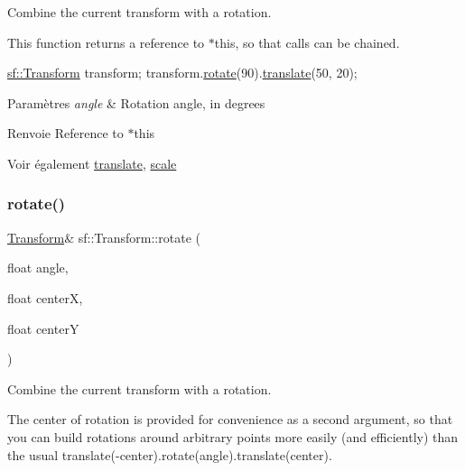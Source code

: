 Combine the current transform with a rotation. 

This function returns a reference to $\ast$this, so that calls can be chained. 
\begin{DoxyCode}
\hyperlink{classsf_1_1Transform}{sf::Transform} transform;
transform.\hyperlink{classsf_1_1Transform_a3e548c3c9e3fb9d4bd43cf852669e555}{rotate}(90).\hyperlink{classsf_1_1Transform_ab54f6c8070cc05e2afcb3145fbf4395a}{translate}(50, 20);
\end{DoxyCode}



\begin{DoxyParams}{Paramètres}
{\em angle} & Rotation angle, in degrees\\
\hline
\end{DoxyParams}
\begin{DoxyReturn}{Renvoie}
Reference to $\ast$this
\end{DoxyReturn}
\begin{DoxySeeAlso}{Voir également}
\hyperlink{classsf_1_1Transform_ab54f6c8070cc05e2afcb3145fbf4395a}{translate}, \hyperlink{classsf_1_1Transform_a3f46af807f69d74120fb836334268671}{scale} 
\end{DoxySeeAlso}
\mbox{\label{classsf_1_1Transform_af0b7cc3fed36d0fa22d5d331a779eee2}} 
\subsubsection{\texorpdfstring{rotate()}{rotate()}\hspace{0.1cm}{\footnotesize\ttfamily [2/3]}}
{\footnotesize\ttfamily \hyperlink{classsf_1_1Transform}{Transform}\& sf\+::\+Transform\+::rotate (\begin{DoxyParamCaption}\item[{float}]{angle,  }\item[{float}]{centerX,  }\item[{float}]{centerY }\end{DoxyParamCaption})}



Combine the current transform with a rotation. 

The center of rotation is provided for convenience as a second argument, so that you can build rotations around arbitrary points more easily (and efficiently) than the usual translate(-\/center).rotate(angle).translate(center).

